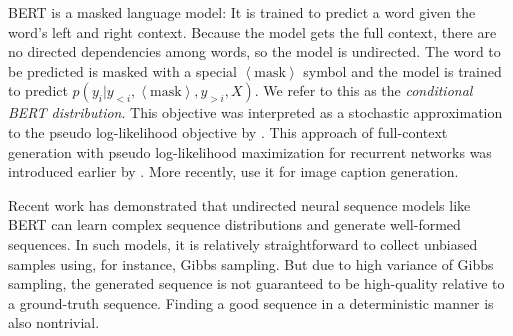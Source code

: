 \documentclass{article}
\begin{document}
BERT \citep{devlin2019bert} is a masked language model: It is trained to predict a word given the word's left and right context.
Because the model gets the full context, there are no directed dependencies among words, so the model is undirected.
The word to be predicted is masked with a special $\left< \text{mask} \right>$ symbol and the model is trained to predict  
$p(y_i | y_{<i}, \left< \text{mask} \right>, y_{>i}, X)$. We refer to this as the {\it conditional BERT distribution}.
This objective was interpreted as a stochastic approximation to the pseudo log-likelihood objective \citep{besag1977pll} by \citet{wang2019bert}. 
This approach of full-context generation with pseudo log-likelihood maximization for recurrent networks was introduced earlier by \citet{berglund2015bidirectional}.
More recently, \citet{sun2017bibs} use it for image caption generation.



Recent work \citep{wang2019bert,ghazvininejad2019constant} has demonstrated that undirected neural sequence models like BERT can learn complex sequence distributions and generate well-formed sequences. In such models, it is relatively straightforward to collect unbiased samples using, for instance, Gibbs sampling. 
But due to high variance of Gibbs sampling, the generated sequence is not guaranteed to be high-quality relative to a ground-truth sequence. 
Finding a good sequence in a deterministic manner is also nontrivial.
\end{document}
